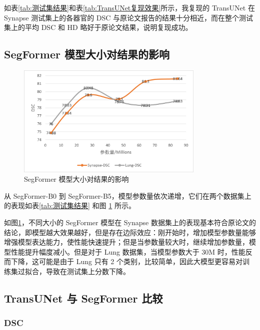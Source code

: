 \documentclass[hyperref,a4paper,UTF8]{ctexart}
\begin{document}
如表\ref{tab:测试集结果}和表\ref{tab:TransUNet复现效果}所示，我复现的 TransUNet 在 Synapse 测试集上的各器官的 DSC 与原论文报告的结果十分相近，而在整个测试集上的平均 DSC 和 HD 略好于原论文结果，说明复现成功。

\subsection{SegFormer 模型大小对结果的影响}

\begin{figure}[h]
    \centering
    \includegraphics[width=0.8\textwidth]{figures/SegFormer模型大小对结果的影响.png}
    \caption{SegFormer 模型大小对结果的影响}
    \label{fig:SegFormer模型大小对结果的影响}
\end{figure}

从 SegFormer-B0 到 SegFormer-B5，模型参数量依次递增，它们在两个数据集上的表现如表\ref{tab:测试集结果} 和图 \ref{fig:SegFormer模型大小对结果的影响} 所示。

如图\ref{fig:SegFormer模型大小对结果的影响}，不同大小的 SegFormer 模型在 Synapse 数据集上的表现基本符合原论文\cite{SegFormer}的结论，即模型越大效果越好，但是存在边际效应：刚开始时，增加模型参数量能够增强模型表达能力，使性能快速提升；但是当参数量较大时，继续增加参数量，模型性能提升幅度减小。但是对于 Lung 数据集，当模型参数大于 30M 时，性能反而下降，这可能是由于 Lung 只有 2 个类别，比较简单，因此大模型更容易对训练集过拟合，导致在测试集上分数下降。

\subsection{TransUNet 与 SegFormer 比较}

\subsubsection{DSC}
\end{document}
